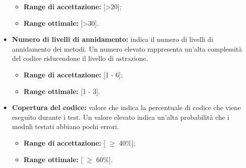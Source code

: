 \begin{itemize}
\begin{itemize}
		\item \textbf{Range di accettazione:} [>20];
		\item \textbf{Range ottimale:} [>30].
	\end{itemize}
	\item \textbf{Numero di livelli di annidamento:} indica il numero di livelli di annidamento dei metodi. Un numero elevato rappresenta un'alta complessità del codice riducendone il livello di astrazione.
	\begin{itemize}
		\item \textbf{Range di accettazione:} [1 - 6];
		\item \textbf{Range ottimale:} [1 - 3].
	\end{itemize}
	\item \textbf{Copertura del codice:} valore che indica la percentuale di codice che viene eseguito durante i test.
	Un valore elevato indica un'alta probabilità che i moduli testati abbiano pochi errori.
	\begin{itemize}
		\item \textbf{Range di accettazione:} [ $\geq$ 40\%];
		\item \textbf{Range ottimale:} [ $\geq$ 60\%].
	\end{itemize}
\end{itemize}



